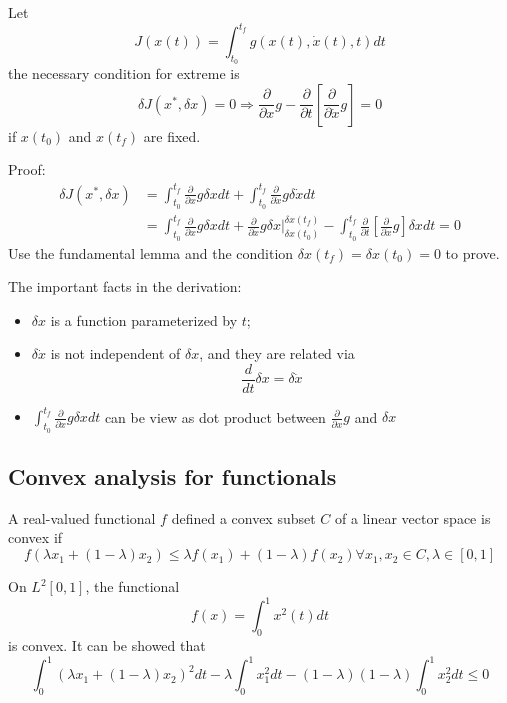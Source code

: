 \begin{refsection}
\begin{theorem}
Let $$J(x(t))=\int_{t_0}^{t_f} g(x(t),\dot{x}(t),t)dt$$
the necessary condition for extreme is
$$\delta J(x^*,\delta x) = 0 \Rightarrow \frac{\partial }{\partial x}g - \frac{\partial}{\partial t}[\frac{\partial}{\partial \dot{x}}g] = 0 $$
if $x(t_0)$ and $x(t_f)$ are fixed. 
\end{theorem}
Proof:
\begin{align*}
    \delta J(x^*,\delta x) &= \int_{t_0}^{t_f} \frac{\partial }{\partial x}g \delta x dt + \int_{t_0}^{t_f} \frac{\partial }{\partial \dot{x}}g \delta \dot{x} dt \\
    & = \int_{t_0}^{t_f} \frac{\partial }{\partial x}g \delta x dt + \frac{\partial }{\partial \dot{x}}g \delta x |^{\delta x(t_f)}_{\delta x(t_0)} - \int_{t_0}^{t_f} \frac{\partial}{\partial t}[\frac{\partial}{\partial \dot{x}}g] \delta x dt = 0
\end{align*}
Use the fundamental lemma and the condition $\delta x(t_f) = \delta x(t_0) = 0$ to prove.  


\begin{remark}The important facts in the derivation:
\begin{itemize}
    \item $\delta x$ is a function parameterized by $t$;
    \item $\delta \dot{x}$ is not independent of $\delta x$, and they are related via
    $$\frac{d}{dt} \delta x = \delta \dot{x}$$
    \item $\int_{t_0}^{t_f} \frac{\partial }{\partial x}g \delta x dt$ can be view as dot product between $\frac{\partial }{\partial x}g $ and $\delta x$
\end{itemize}
\end{remark}



\subsection{Convex analysis for functionals}
\begin{definition}
A real-valued functional $f$ defined a convex subset $C$ of a linear vector space is convex if $$f(\lambda x_1 + (1-\lambda)x_2) \leq \lambda f(x_1) + (1-\lambda) f(x_2) \forall x_1,x_2 \in C, \lambda \in [0,1]$$
\end{definition}

\begin{example}
On $L^2[0,1]$, the functional 
$$f(x) = \int_0^1 x^2(t) dt$$
is convex. It can be showed that
$$\int_0^1 (\lambda x_1 + (1 - \lambda) x_2)^2 dt - \lambda \int_0^1 x_1^2 dt - (1 - \lambda) (1- \lambda) \int_0^1 x_2^2 dt \leq 0 $$
\end{example}



\end{refsection}
